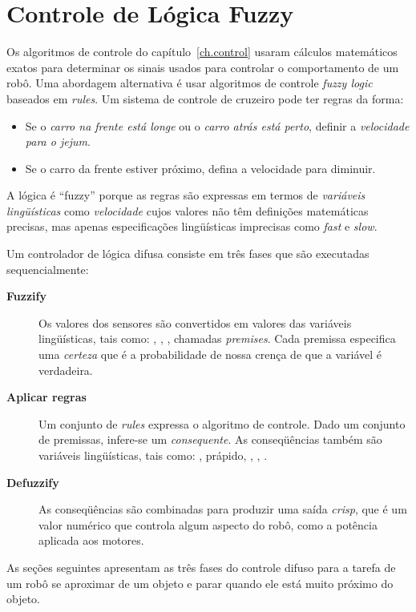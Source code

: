 
\chapter{Controle de Lógica Fuzzy}\label{ch.fuzzy}

Os algoritmos de controle do capítulo~\ref{ch.control} usaram cálculos matemáticos exatos para determinar os sinais usados para controlar o comportamento de um robô. Uma abordagem alternativa é usar algoritmos de controle \emph{fuzzy logic} baseados em \emph{rules}. Um sistema de controle de cruzeiro pode ter regras da forma:
\begin{itemize}
\item Se o \emph{carro na frente está longe} ou o \emph{carro atrás está perto}, definir a \emph{velocidade para o jejum}.
\item Se o carro da frente estiver próximo, defina a velocidade para diminuir.
\end{itemize}
A lógica é ``fuzzy'' porque as regras são expressas em termos de \emph{variáveis lingüísticas} como \emph{velocidade} cujos valores não têm definições matemáticas precisas, mas apenas especificações lingüísticas imprecisas como \emph{fast} e \emph{slow}.

Um controlador de lógica difusa consiste em três fases que são executadas sequencialmente:

\begin{description}
\item[\textbf{Fuzzify}] Os valores dos sensores são convertidos em valores das variáveis lingüísticas, tais como: , , , chamadas \emph{premises}. Cada premissa especifica uma \emph{certeza} que é a probabilidade de nossa crença de que a variável é verdadeira.
\item[\textbf{Aplicar regras}] Um conjunto de \emph{rules} expressa o algoritmo de controle. Dado um conjunto de premissas, infere-se um \emph{consequente}. As conseqüências também são variáveis lingüísticas, tais como: , p{rápido}, , , .
\item[\textbf{Defuzzify}] As conseqüências são combinadas para produzir uma saída \emph{crisp}, que é um valor numérico que controla algum aspecto do robô, como a potência aplicada aos motores.
\end{description}

As seções seguintes apresentam as três fases do controle difuso para a tarefa de um robô se aproximar de um objeto e parar quando ele está muito próximo do objeto.

